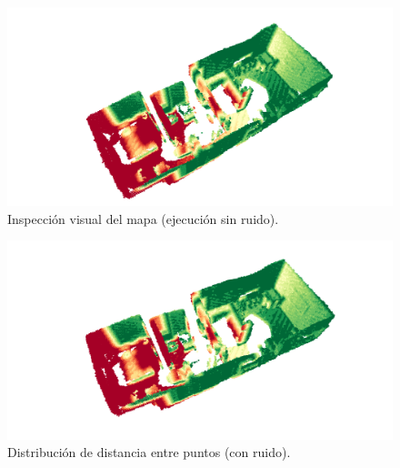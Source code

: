 \documentclass[12pt, a4paper, twoside]{article}
\begin{document}
\begin{figure}[h]
  \centering
    \includegraphics[width=1\textwidth]{map_clean.png}
  \caption{Inspección visual del mapa (ejecución sin ruido).}
\end{figure} 

\begin{figure}[h]
  \centering
    \includegraphics[width=1\textwidth]{map_noisy.png}
  \caption{Distribución de distancia entre puntos (con ruido).}
\end{figure} 
\end{document}
